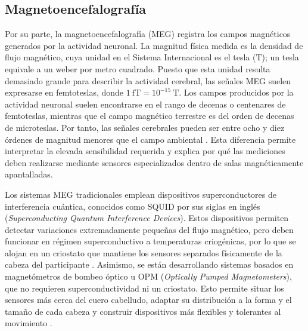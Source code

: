 

\subsection{Magnetoencefalografía}

Por su parte, la magnetoencefalografía (MEG) registra los campos magnéticos generados por la actividad neuronal. La magnitud física medida es la densidad de flujo magnético, cuya unidad en el Sistema Internacional es el tesla (\(\mathrm{T}\)); un tesla equivale a un weber por metro cuadrado. Puesto que esta unidad resulta demasiado grande para describir la actividad cerebral, las señales MEG suelen expresarse en femtoteslas, donde \(1~\mathrm{fT}=10^{-15}~\mathrm{T}\). Los campos producidos por la actividad neuronal suelen encontrarse en el rango de decenas o centenares de femtoteslas, mientras que el campo magnético terrestre es del orden de decenas de microteslas. Por tanto, las señales cerebrales pueden ser entre ocho y diez órdenes de magnitud menores que el campo ambiental \cite{hamalainen1993meg}. Esta diferencia permite interpretar la elevada sensibilidad requerida y explica por qué las mediciones deben realizarse mediante sensores especializados dentro de salas magnéticamente apantalladas.

Los sistemas MEG tradicionales emplean dispositivos superconductores de interferencia cuántica, conocidos como SQUID por sus siglas en inglés (\textit{Superconducting Quantum Interference Devices}). Estos dispositivos permiten detectar variaciones extremadamente pequeñas del flujo magnético, pero deben funcionar en régimen superconductivo a temperaturas criogénicas, por lo que se alojan en un criostato que mantiene los sensores separados físicamente de la cabeza del participante \cite{hamalainen1993meg}. Asimismo, se están desarrollando sistemas basados en magnetómetros de bombeo óptico u OPM (\textit{Optically Pumped Magnetometers}), que no requieren superconductividad ni un criostato. Esto permite situar los sensores más cerca del cuero cabelludo, adaptar su distribución a la forma y el tamaño de cada cabeza y construir dispositivos más flexibles y tolerantes al movimiento \cite{boto2018wearable}.

